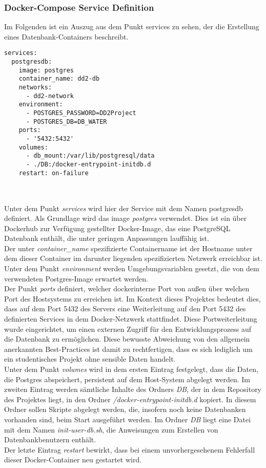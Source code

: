 \subsubsection{Docker-Compose Service Definition}
\label{sec-docker-db}
Im Folgenden ist ein Auszug aus dem Punkt services zu sehen, der die Erstellung eines Datenbank-Containers beschreibt. 
\begin{lstlisting}[language={}, caption={Datenbank Container}, captionpos=b, label={fig:Datenbank Container}]
services:
  postgresdb:
    image: postgres
    container_name: dd2-db
    networks:
      - dd2-network
    environment:
      - POSTGRES_PASSWORD=DD2Project
      - POSTGRES_DB=DB_WATER
    ports:
      - '5432:5432'
    volumes:
      - db_mount:/var/lib/postgresql/data
      - ./DB:/docker-entrypoint-initdb.d
    restart: on-failure
    
\end{lstlisting}
~\\Unter dem Punkt \textit{services} wird hier der Service mit dem Namen postgresdb definiert. 
Als Grundlage wird das image \textit{postgres} verwendet. Dies ist ein über Dockerhub \cite{docker-hub} 
zur Verfügung gestellter Docker-Image, das eine PostgreSQL Datenbank enthält, die unter geringen 
Anpassungen lauffähig ist. \\
Der unter \textit{container\_name} spezifizierte Containername ist der Hostname unter dem 
dieser Container im darunter liegenden spezifizierten Netzwerk erreichbar ist. \\
Unter dem Punkt \textit{environment} werden Umgebungsvariablen gesetzt, die von dem 
verwendeten Postgres-Image erwartet werden. \\
Der Punkt \textit{ports} definiert, welcher dockerinterne Port von außen über welchen Port des Hostsystems zu erreichen ist. 
Im Kontext dieses Projektes bedeutet dies, dass auf dem Port 5432 des Servers eine Weiterleitung 
auf den Port 5432 des definierten Services in dem Docker-Netzwerk stattfindet. 
Diese Portweiterleitung wurde eingerichtet, um einen externen Zugriff für den Entwicklungsprozess 
auf die Datenbank zu ermöglichen. Diese bewusste Abweichung von den allgemein anerkannten 
Best-Practices ist damit zu rechtfertigen, dass es sich lediglich um ein studentisches Projekt 
ohne sensible Daten handelt. \\
Unter dem Punkt \textit{volumes} wird in dem ersten Eintrag festgelegt, dass die Daten, die Postgres abspeichert, persistent auf dem Host-System abgelegt werden. 
Im zweiten Eintrag werden sämtliche Inhalte des Ordners \textit{DB}, der in dem Repository des Projektes liegt, in den Ordner \textit{/docker-entrypoint-initdb.d} kopiert. 
In diesem Ordner sollen Skripte abgelegt werden, die, insofern noch keine Datenbanken vorhanden sind, beim Start ausgeführt werden. 
Im Ordner \textit{DB} liegt eine Datei mit dem Namen \textit{init-user-db.sh}, die Anweisungen zum Erstellen von Datenbankbenutzern enthält.\\
Der letzte Eintrag \textit{restart} bewirkt, dass bei einem unvorhergesehenem Fehlerfall dieser Docker-Container neu gestartet wird.


